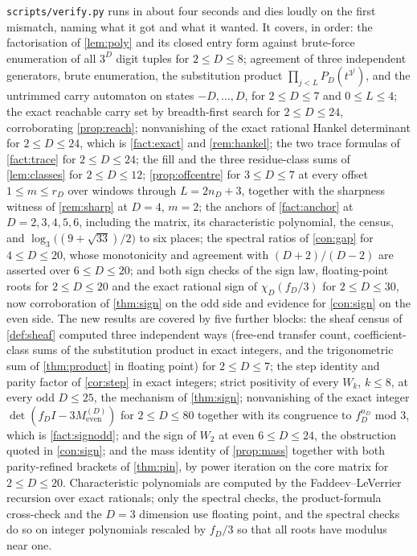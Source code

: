 \documentclass[11pt]{amsart}
\theoremstyle{definition}
\theoremstyle{remark}
\begin{document}
\texttt{scripts/verify.py} runs in about four seconds and dies loudly on the first mismatch, naming what it got and what it wanted. It covers, in order: the factorisation of \cref{lem:poly} and its closed entry form against brute-force enumeration of all $3^D$ digit tuples for $2 \le D \le 8$; agreement of three independent generators, brute enumeration, the substitution product $\prod_{j<L} P_D(t^{3^j})$, and the untrimmed carry automaton on states $-D,\dots,D$, for $2 \le D \le 7$ and $0 \le L \le 4$; the exact reachable carry set by breadth-first search for $2 \le D \le 24$, corroborating \cref{prop:reach}; nonvanishing of the exact rational Hankel determinant for $2 \le D \le 24$, which is \cref{fact:exact} and \cref{rem:hankel}; the two trace formulas of \cref{fact:trace} for $2 \le D \le 24$; the fill and the three residue-class sums of \cref{lem:classes} for $2 \le D \le 12$; \cref{prop:offcentre} for $3 \le D \le 7$ at every offset $1 \le m \le r_D$ over windows through $L = 2n_D+3$, together with the sharpness witness of \cref{rem:sharp} at $D = 4$, $m = 2$; the anchors of \cref{fact:anchor} at $D = 2,3,4,5,6$, including the matrix, its characteristic polynomial, the census, and $\log_3\bigl((9+\sqrt{33})/2\bigr)$ to six places; the spectral ratios of \cref{con:gap} for $4 \le D \le 20$, whose monotonicity and agreement with $(D+2)/(D-2)$ are asserted over $6 \le D \le 20$; and both sign checks of the sign law, floating-point roots for $2 \le D \le 20$ and the exact rational sign of $\chi_D(f_D/3)$ for $2 \le D \le 30$, now corroboration of \cref{thm:sign} on the odd side and evidence for \cref{con:sign} on the even side. The new results are covered by five further blocks: the sheaf census of \cref{def:sheaf} computed three independent ways (free-end transfer count, coefficient-class sums of the substitution product in exact integers, and the trigonometric sum of \cref{thm:product} in floating point) for $2 \le D \le 7$; the step identity and parity factor of \cref{cor:step} in exact integers; strict positivity of every $W_k$, $k \le 8$, at every odd $D \le 25$, the mechanism of \cref{thm:sign}; nonvanishing of the exact integer $\det(f_D I - 3M_{\mathrm{even}}^{(D)})$ for $2 \le D \le 80$ together with its congruence to $f_D^{n_D}$ mod $3$, which is \cref{fact:signodd}; and the sign of $W_2$ at even $6 \le D \le 24$, the obstruction quoted in \cref{con:sign}; and the mass identity of \cref{prop:mass} together with both parity-refined brackets of \cref{thm:pin}, by power iteration on the core matrix for $2 \le D \le 20$. Characteristic polynomials are computed by the Faddeev--LeVerrier recursion over exact rationals; only the spectral checks, the product-formula cross-check and the $D = 3$ dimension use floating point, and the spectral checks do so on integer polynomials rescaled by $f_D/3$ so that all roots have modulus near one.
\end{document}
